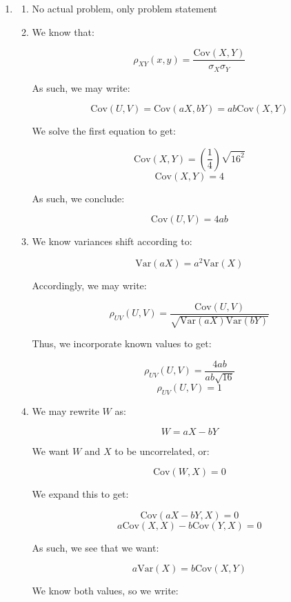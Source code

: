 \begin{enumerate}
\begin{enumerate}
    \end{enumerate}

  \item

    \begin{enumerate}

      \item No actual problem, only problem statement

      \item We know that:

        $$\rho_{XY}(x,y)=\frac{\text{Cov}(X,Y)}{\sigma_X\sigma_Y}$$

        As such, we may write:

        $$\text{Cov}(U,V)=\text{Cov}(aX,bY)=ab\text{Cov}(X,Y)$$

        We solve the first equation to get:

        $$\text{Cov}(X,Y)=\left( \frac{1}{4} \right)\sqrt{16^2}$$
        $$\text{Cov}(X,Y)=4$$

        As such, we conclude:

        $$\boxed{\text{Cov}(U,V)=4ab}$$

      \item We know variances shift according to:

        $$\text{Var}(aX)=a^2\text{Var}(X)$$

        Accordingly, we may write:

        $$\rho_{UV}(U,V)=\frac{\text{Cov}(U,V)}{\sqrt{\text{Var}(aX)\text{Var}(bY)}}$$

        Thus, we incorporate known values to get:

        $$\rho_{UV}(U,V)=\frac{4ab}{ab\sqrt{16}}$$
        $$\boxed{\rho_{UV}(U,V)=1}$$

      \item We may rewrite $W$ as:

        $$W=aX-bY$$

        We want $W$ and $X$ to be uncorrelated, or:

        $$\text{Cov}(W,X)=0$$

        We expand this to get:

        $$\text{Cov}(aX-bY,X)=0$$
        $$a\text{Cov}(X,X)-b\text{Cov}(Y,X)=0$$

        As such, we see that we want:

        $$a\text{Var}(X)=b\text{Cov}(X,Y)$$

        We know both values, so we write:


\end{enumerate}
\end{enumerate}
